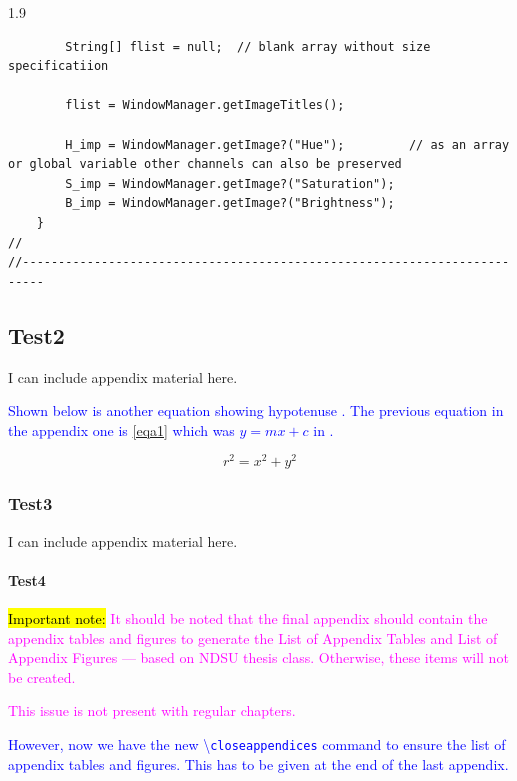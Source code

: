 \documentclass[phd]{ndsu-thesis-2022}
\newcommand\myspacing{1.9} %
\newcommand\italk[1]{\textcolor{blue}{#1}}  %
\newcommand\cmd[1]{\textbackslash\texttt{#1}}  %
\begin{document}
\begin{spacing}{\myspacing}
{\begin{lstlisting}
		String[] flist = null;  // blank array without size specificatiion

		flist = WindowManager.getImageTitles();
		
		H_imp = WindowManager.getImage?("Hue");			// as an array or global variable other channels can also be preserved
		S_imp = WindowManager.getImage?("Saturation");
		B_imp = WindowManager.getImage?("Brightness");
	}	
//
//-------------------------------------------------------------------------	
\end{lstlisting}
}

\subsection{Test2}
I can include appendix material here. 

\italk{Shown below is another equation showing hypotenuse \Cref{eqc1}. The previous equation in the appendix one is \cref{eqa1} which was $y = mx + c$ in \cpageref{eqa1}. } 
 
\vspace{-3ex}
\begin{equation}
r^2 = x^2 + y^2
\label{eqc1}
\end{equation}

\vspace{-2ex}
\subsubsection{Test3}
I can include appendix material here. 

\paragraph{Test4}

{\hl{Important note:}
\textcolor{magenta}{It should be noted that the final appendix should contain the appendix tables and figures to generate the List of Appendix Tables and List of Appendix Figures --- based on NDSU thesis class. Otherwise, these items will not be created.}
} 

\textcolor{magenta}{This issue is not present with regular chapters.}

\italk{However, now we have the new \cmd{closeappendices} command to ensure the list of appendix tables and figures. This has to be given at the end of the last appendix.}


\end{spacing}
\end{document}
